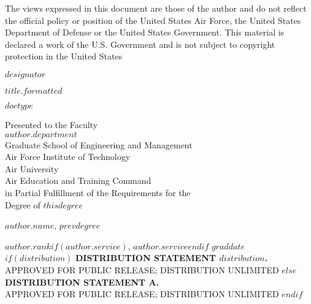 \documentclass[12pt,letterpaper,oneside]{report}
\begin{document}
	\thispagestyle{empty}
	\singlespacing
	\null	
	\vfill 
	\noindent The views expressed in this document are those of the
author and do not reflect the official policy or position of the
United States Air Force, the United States Department of Defense or
the United States Government.  This material is declared a work of the
U.S. Government and is not subject to copyright protection in the
United States
	\vfill 
	\doublespacing
	\newpage
	\pagestyle{plain}
    \begin{titlepage}
	\thispagestyle{empty}
	\noindent $designator$  
	\vfill
	\begin{center}
	    \MakeUppercase{$title.formatted$}\par
	    \vskip 1cm
	    \MakeUppercase{$doctype$}\par
	    \vskip 1cm
	    Presented to the Faculty\\
	    $author.department$\\
	    Graduate School of Engineering and Management~\\
	    Air Force Institute of Technology~\\
	    Air University~\\
	    Air Education and Training Command~\\
	    in Partial Fulfillment of the Requirements for the~\\
	    Degree of $thisdegree$\\
	    \vskip 1cm
	    {$author.name$, $prevdegree$\par}
	    {$author.rank$$if(author.service)$, \MakeUppercase{$author.service$}$endif$}
	    \vskip 1cm
	    $graddate$
	    \vskip 1cm
	    $if(distribution)$
	    \MakeUppercase{\textbf{distribution statement $distribution$.}}\\[-8pt]
	    \MakeUppercase{approved for public release; distribution unlimited}
	    $else$
	    \MakeUppercase{\textbf{distribution statement a.}}\\[-8pt]
	    \MakeUppercase{Approved for Public Release; distribution unlimited}
	    $endif$	    
	    \vfill
	\end{center}
	\newpage 
	\pagestyle{plain}
    \end{titlepage}
\end{document}
